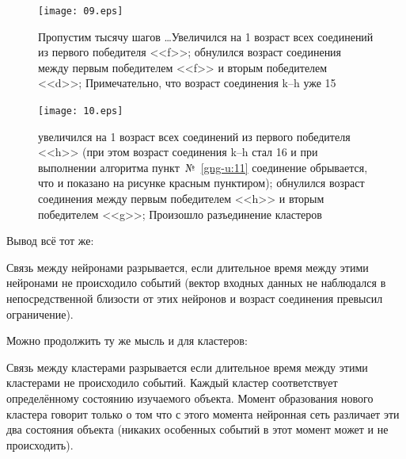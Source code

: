 \documentclass[unicode, 12pt, a4paper,oneside,fleqn]{article}
\begin{document}
\begin{figure}[h]
  \center
  \texttt{[image: 09.eps]}
  \caption{Пропустим тысячу шагов \ldots Увеличился на 1 возраст всех
    соединений из первого победителя <<f>>; обнулился возраст
    соединения между первым победителем <<f>> и вторым победителем
    <<d>>; Примечательно, что возраст соединения k--h уже 15}
  \label{conn-step:09}
\end{figure}

\begin{figure}[h]
  \center
  \texttt{[image: 10.eps]}
  \caption{увеличился на 1 возраст всех соединений из первого
    победителя <<h>> (при этом возраст соединения k--h стал 16 и при
    выполнении алгоритма пункт~№~\ref{gng-u:11} соединение обрывается,
    что и показано на рисунке красным пунктиром); обнулился возраст
    соединения между первым победителем <<h>> и вторым победителем
    <<g>>; Произошло разъединение кластеров}
  \label{conn-step:10}
\end{figure}

\clearpage

Вывод всё тот же:

Связь между нейронами разрывается, если длительное время между этими
нейронами не происходило событий (вектор входных данных не наблюдался
в непосредственной близости от этих нейронов и возраст соединения
превысил ограничение).

Можно продолжить ту же мысль и для кластеров:

Связь между кластерами разрывается если длительное время между этими
кластерами не происходило событий. Каждый кластер соответствует
определённому состоянию изучаемого объекта. Момент образования нового
кластера говорит только о том что с этого момента нейронная сеть
различает эти два состояния объекта (никаких особенных событий в этот
момент может и не происходить).


\newpage


\end{document}
